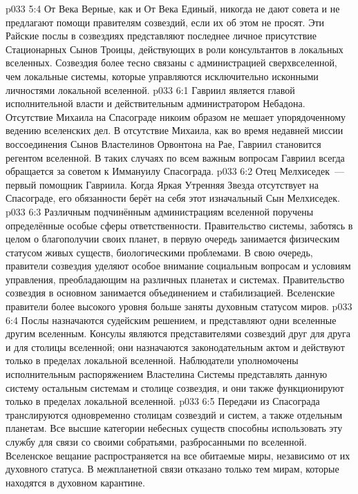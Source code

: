 \vs p033 5:4 От Века Верные, как и От Века Единый, никогда не дают совета и не предлагают помощи правителям созвездий, если их об этом не просят. Эти Райские послы в созвездиях представляют последнее личное присутствие Стационарных Сынов Троицы, действующих в роли консультантов в локальных вселенных. Созвездия более тесно связаны с администрацией сверхвселенной, чем локальные системы, которые управляются исключительно исконными личностями локальной вселенной.
\vs p033 6:1 Гавриил является главой исполнительной власти и действительным администратором Небадона. Отсутствие Михаила на Спасограде никоим образом не мешает упорядоченному ведению вселенских дел. В отсутствие Михаила, как во время недавней миссии воссоединения Сынов Властелинов Орвонтона на Рае, Гавриил становится регентом вселенной. В таких случаях по всем важным вопросам Гавриил всегда обращается за советом к Иммануилу Спасограда.
\vs p033 6:2 Отец Мелхиседек~--- первый помощник Гавриила. Когда Яркая Утренняя Звезда отсутствует на Спасограде, его обязанности берёт на себя этот изначальный Сын Мелхиседек.
\vs p033 6:3 \pc Различным подчинённым администрациям вселенной поручены определённые особые сферы ответственности. Правительство системы, заботясь в целом о благополучии своих планет, в первую очередь занимается физическим статусом живых существ, биологическими проблемами. В свою очередь, правители созвездия уделяют особое внимание социальным вопросам и условиям управления, преобладающим на различных планетах и системах. Правительство созвездия в основном занимается объединением и стабилизацией. Вселенские правители более высокого уровня больше заняты духовным статусом миров.
\vs p033 6:4 \pc Послы назначаются судейским решением, и представляют одни вселенные другим вселенным. Консулы являются представителями созвездий друг для друга и для столицы вселенной; они назначаются законодательным актом и действуют только в пределах локальной вселенной. Наблюдатели уполномочены исполнительным распоряжением Властелина Системы представлять данную систему остальным системам и столице созвездия, и они также функционируют только в пределах локальной вселенной.
\vs p033 6:5 \pc Передачи из Спасограда транслируются одновременно столицам созвездий и систем, а также отдельным планетам. Все высшие категории небесных существ способны использовать эту службу для связи со своими собратьями, разбросанными по вселенной. Вселенское вещание распространяется на все обитаемые миры, независимо от их духовного статуса. В межпланетной связи отказано только тем мирам, которые находятся в духовном карантине.
